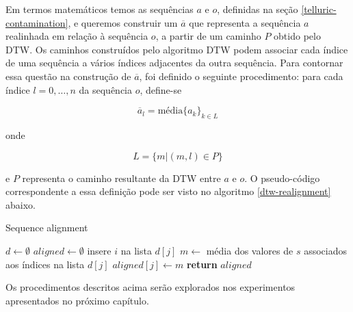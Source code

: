 Em termos matemáticos temos as sequências $a$ e $o$, definidas na seção \ref{telluric-contamination}, e queremos construir um $\overline{a}$ que representa a sequência $a$ realinhada em relação à sequência $o$, a partir de um caminho $P$ obtido pelo DTW. Os caminhos construídos pelo algoritmo DTW podem associar cada índice de uma sequência a vários índices adjacentes da outra sequência. Para contornar essa questão na construção de $\overline{a}$, foi definido o seguinte procedimento: para cada índice $l=0,\ldots,n$ da sequência $o$, define-se

\begin{equation*}
    \overline{a}_l = \mbox{média} \{a_k\}_{k \in L}
\end{equation*}

\noindent onde

\begin{equation*}
  L = \{m | (m, l) \in P\}
\end{equation*}

\noindent e $P$ representa o caminho resultante da DTW entre $a$ e $o$. O pseudo-código correspondente a essa definição pode ser visto no algoritmo \ref{dtw-realignment} abaixo.

\begin{algorithm}[H]
\caption{Sequence alignment}\label{dtw-realignment}
\begin{algorithmic}[1]
    \State $d \gets \emptyset$ 
    \State $aligned \gets \emptyset$
        \State insere $i$ na lista $d[j]$
    \EndFor
        \State $m \gets$ média dos valores de $s$ associados aos índices na lista $d[j]$
        \State $aligned[j] \gets m$
    \EndFor
\State \textbf{return} $aligned$
\EndProcedure
\end{algorithmic}
\end{algorithm}

Os procedimentos descritos acima serão explorados nos experimentos apresentados no próximo capítulo.